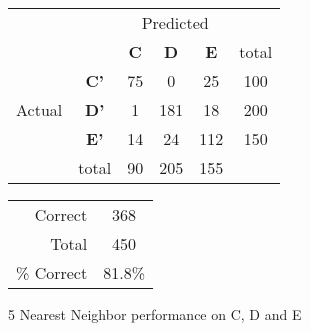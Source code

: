 	
\begin{figure}[!ht]
\begin{minipage}[b]{0.5\linewidth}
\centering
	\begin{tabular}{ccc|c|c|c}
	 & &\multicolumn{3}{c}{Predicted} &\\
	  & & \bf{C} &  \bf{D} & \bf{E} & total \\
	 \cline{3-5}
	 \multirow{3}{*}{\begin{sideways}Actual\end{sideways}} & \bf{C'}& 75 & 0 & 25 & 100\\
	 \cline{3-6}
	 & \bf{D'}& 1 & 181 & 18 & 200\\
	  \cline{3-6}
	 & \bf{E'}& 14 & 24 & 112 &  150\\
	  \cline{3-6}
	 &total&90&205&155\\
	\end{tabular}
\end{minipage}
\hspace{0.5cm}
\begin{minipage}[b]{0.5\linewidth}
	\begin{tabular}{r|c}
	\hline
	Correct& 368\\
	Total& 450\\
	\hline
	\% Correct& 81.8\%\\
	\hline
	\end{tabular}
\end{minipage}
\vspace{1mm}
\caption{5 Nearest Neighbor performance on C, D and E}
\end{figure}
 
 
\clearpage
